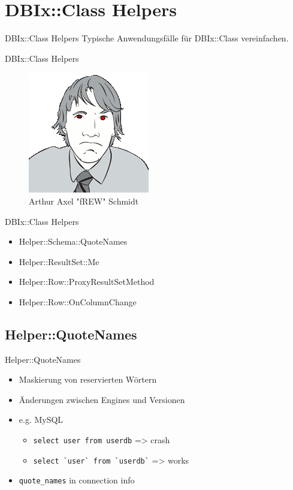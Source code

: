 \section{DBIx::Class Helpers}

\begin{frame}{DBIx::Class Helpers}
Typische Anwendungsfälle für DBIx::Class vereinfachen.
\end{frame}

\begin{frame}{DBIx::Class Helpers}
\begin{figure}[!ht]
\centering
\includegraphics[width=0.4\linewidth]{img/frew.png}
\caption{Arthur Axel "fREW" Schmidt}
\end{figure}
\end{frame}


\begin{frame}{DBIx::Class Helpers}
\begin{itemize}
\item Helper::Schema::QuoteNames
\item Helper::ResultSet::Me
\item Helper::Row::ProxyResultSetMethod
\item Helper::Row::OnColumnChange
\end{itemize}
\end{frame}

\subsection{Helper::QuoteNames}

\begin{frame}[fragile]{Helper::QuoteNames}
\begin{itemize}
\item Maskierung von reservierten Wörtern
\item Änderungen zwischen Engines und Versionen
\item e.g. MySQL
\begin{itemize}
\item \verb|select user from userdb| => crash
\item \verb|select `user` from `userdb`| => works
\end{itemize}
\item \verb|quote_names| in connection info
\end{itemize}
\end{frame}

